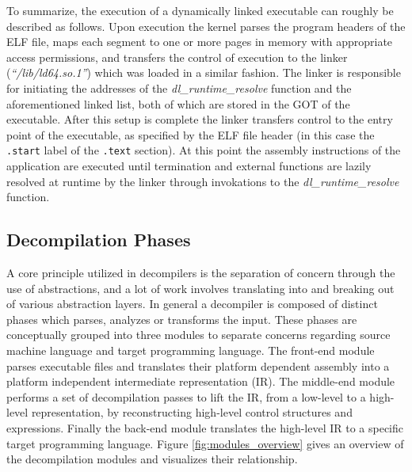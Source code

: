 To summarize, the execution of a dynamically linked executable can roughly be described as follows. Upon execution the kernel parses the program headers of the ELF file, maps each segment to one or more pages in memory with appropriate access permissions, and transfers the control of execution to the linker (\textit{``/lib/ld64.so.1''}) which was loaded in a similar fashion. The linker is responsible for initiating the addresses of the \textit{dl\_runtime\_resolve} function and the aforementioned linked list, both of which are stored in the GOT of the executable. After this setup is complete the linker transfers control to the entry point of the executable, as specified by the ELF file header (in this case the \texttt{.start} label of the \texttt{.text} section). At this point the assembly instructions of the application are executed until termination and external functions are lazily resolved at runtime by the linker through invokations to the \textit{dl\_runtime\_resolve} function.


\subsection{Decompilation Phases}

A core principle utilized in decompilers is the separation of concern through the use of abstractions, and a lot of work involves translating into and breaking out of various abstraction layers. In general a decompiler is composed of distinct phases which parses, analyzes or transforms the input. These phases are conceptually grouped into three modules to separate concerns regarding source machine language and target programming language. The front-end module parses executable files and translates their platform dependent assembly into a platform independent intermediate representation (IR). The middle-end module performs a set of decompilation passes to lift the IR, from a low-level to a high-level representation, by reconstructing high-level control structures and expressions. Finally the back-end module translates the high-level IR to a specific target programming language. Figure \ref{fig:modules_overview} gives an overview of the decompilation modules and visualizes their relationship.

